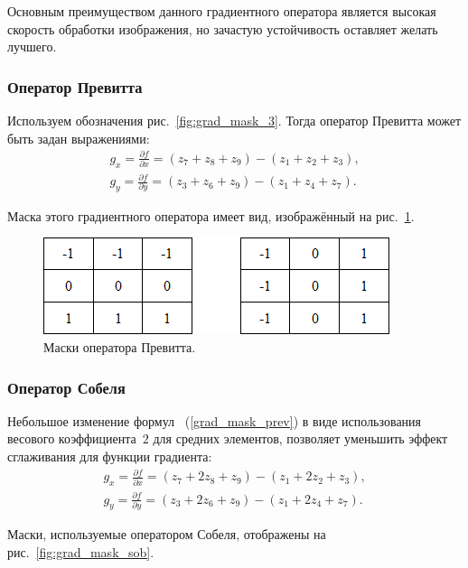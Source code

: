 \documentclass[12pt,a4paper]{article} %
\begin{document}
Основным преимуществом данного градиентного оператора является высокая скорость обработки изображения, но зачастую устойчивость оставляет желать лучшего. 

\subsubsection{Оператор Превитта}

Используем обозначения рис.~\ref{fig:grad_mask_3}. Тогда оператор Превитта может быть задан выражениями:
\begin{gather}\label{grad_mask_prev}
	g_x = \frac{\partial f}{\partial x} = (z_7+z_8+z_9)-(z_1+z_2+z_3),\\
	g_y = \frac{\partial f}{\partial y} = (z_3+z_6+z_9)-(z_1+z_4+z_7).
\end{gather}

Маска этого градиентного оператора имеет вид, изображённый на рис.~\ref{fig:grad_mask_prev}.

\begin{figure}[h]
	
	\centering
	
	\includegraphics[width=0.4\linewidth]{grad_mask_prev.jpg}
	
	\caption{Маски оператора Превитта.}
	
	\label{fig:grad_mask_prev}
	
\end{figure}

\subsubsection{Оператор Собеля}

Небольшое изменение формул ~(\ref{grad_mask_prev}) в виде использования весового коэффициента~$2$ для средних элементов, позволяет уменьшить эффект сглаживания для функции градиента:
\begin{gather}\label{grad_mask_sob}
	g_x = \frac{\partial f}{\partial x} = (z_7+2z_8+z_9)-(z_1+2z_2+z_3),\\
	g_y = \frac{\partial f}{\partial y} = (z_3+2z_6+z_9)-(z_1+2z_4+z_7).
\end{gather}

Маски, используемые оператором Собеля, отображены на рис.~\ref{fig:grad_mask_sob}.
\end{document}
